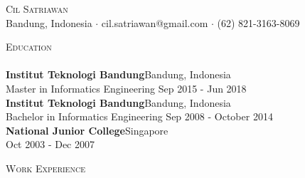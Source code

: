 \documentclass[a4paper]{article}
\newcommand{\lineunder} {
    \vspace*{-8pt} \\
    \hspace*{-18pt} \hrulefill \\
}
\newcommand{\header} [1] {
    {\hspace*{-18pt}\vspace*{6pt} \textsc{#1}}
    \vspace*{-6pt} \lineunder
}
\begin{document}
\vspace*{-40pt}

    

\vspace*{-10pt}
\begin{center}
	{\Huge \scshape {Cil Satriawan}}\\
	Bandung, Indonesia $\cdot$ cil.satriawan@gmail.com $\cdot$ (62) 821-3163-8069\\
\end{center}

\header{Education}
\vspace{1mm}
\textbf{Institut Teknologi Bandung}\hfill Bandung, Indonesia\\
Master in Informatics Engineering \hfill Sep 2015 - Jun 2018\\
\vspace{5mm}
\textbf{Institut Teknologi Bandung}\hfill Bandung, Indonesia\\
Bachelor in Informatics Engineering \hfill Sep 2008 - October 2014\\
\vspace{5mm}
\vspace{5mm}
\textbf{National Junior College}\hfill Singapore\\
\hfill Oct 2003 - Dec 2007\\
\vspace{5mm}

\header{Work Experience}
\vspace{1mm}
\end{document}
